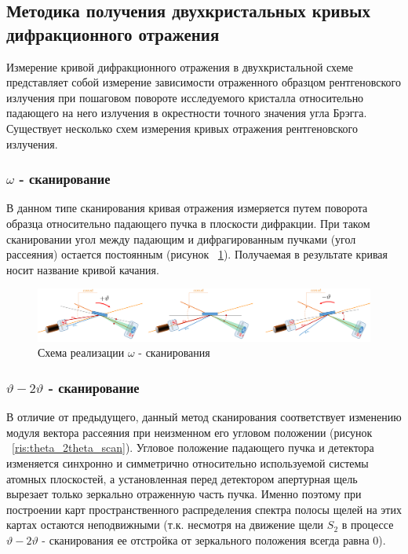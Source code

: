 \subsection{Методика получения двухкристальных кривых дифракционного отражения}

Измерение кривой дифракционного отражения в двухкристальной схеме представляет
собой измерение зависимости отраженного образцом рентгеновского излучения при
пошаговом повороте исследуемого кристалла относительно падающего на него
излучения в окрестности точного значения угла Брэгга.
Существует несколько схем измерения кривых отражения рентгеновского излучения.

\subsubsection*{$\omega$ - сканирование}
В данном типе сканирования кривая отражения измеряется путем поворота образца
относительно падающего пучка в плоскости дифракции. При таком сканировании
угол между падающим и дифрагированным пучками (угол рассеяния) остается постоянным
(рисунок ~\ref{ris:omega_scan}). Получаемая в результате кривая носит название кривой качания.


\begin{figure}[H]
  \centering
  \includegraphics[width=1\textwidth]{images/omega_scan.png}
  \caption{Схема реализации $\omega $ - сканирования}
  \label{ris:omega_scan}
\end{figure}

\subsubsection*{$\vartheta - 2\vartheta$ - сканирование}
В отличие от предыдущего, данный метод сканирования соответствует изменению
 модуля вектора рассеяния при неизменном его угловом положении
 (рисунок ~\ref{ris:theta_2theta_scan}). Угловое положение падающего пучка и
 детектора изменяется синхронно и симметрично относительно используемой системы
 атомных плоскостей, а установленная перед детектором апертурная щель вырезает
  только зеркально отраженную часть пучка. Именно поэтому при построении карт
   пространственного распределения спектра полосы щелей на этих картах остаются
   неподвижными (т.к. несмотря на движение щели  $S_2$ в процессе
    $\vartheta - 2\vartheta$ -  сканирования ее отстройка от зеркального
    положения всегда равна 0).

